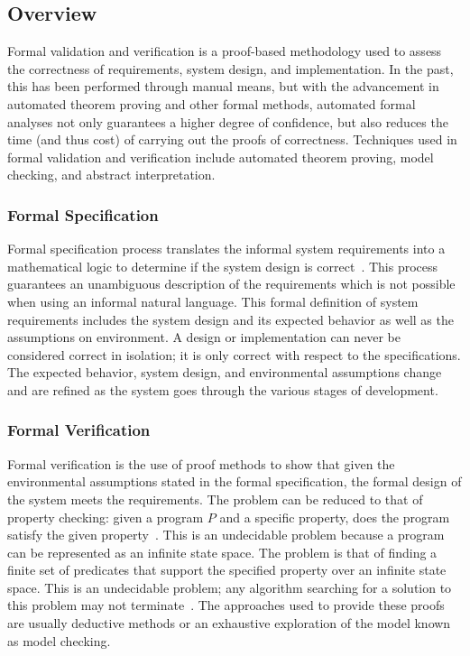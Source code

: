 \subsection{Overview}
Formal validation and verification is a proof-based methodology used to assess the correctness of requirements, system design, and implementation. In the past, this has been performed through manual means, but with the advancement in automated theorem proving and other formal methods, automated formal analyses not only guarantees a higher degree of confidence, but also reduces the time (and thus cost) of carrying out the proofs of correctness. Techniques used in formal validation and verification include automated theorem proving, model checking, and abstract interpretation. 

\subsubsection{Formal Specification}
Formal specification process translates the informal system requirements into a mathematical logic to determine if the system design is correct~\cite{hinchey2012industrial}. This process guarantees an unambiguous description of the requirements which is not possible when using an informal natural language. This formal definition of system requirements includes the system design and its expected behavior as well as the assumptions on environment. A design or implementation can never be considered correct in isolation; it is only correct with respect to the specifications. The expected behavior, system design, and environmental assumptions change and are refined as the system goes through the various stages of development. 

\subsubsection{Formal Verification} 
Formal verification is the use of proof methods to show that given the environmental assumptions stated in the formal specification, the formal design of the system meets the requirements. The problem can be reduced to that of property checking: given a program $P$ and a specific property, does the program satisfy the given property~\cite{fitting2012first}. This is an undecidable problem because a program can be represented as an infinite state space. The problem is that of finding a finite set of predicates that support the specified property over an infinite state space. This is an undecidable problem; any algorithm searching for a solution to this problem may not terminate~\cite{clarke2018model}. The approaches used to provide these proofs are usually deductive methods or an exhaustive exploration of the model known as model checking. 

